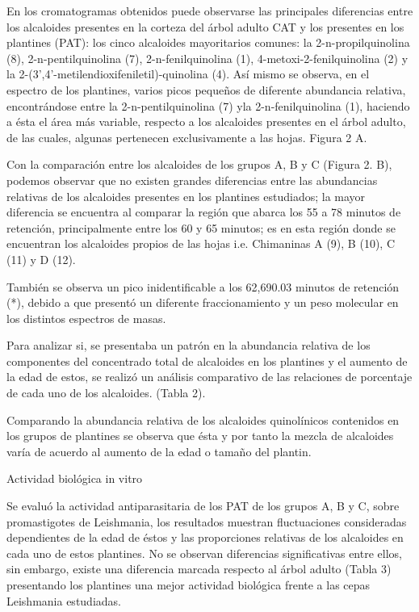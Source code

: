 \documentclass{article}
\begin{document}
En los cromatogramas obtenidos puede observarse las principales diferencias
entre los alcaloides presentes en la corteza del árbol adulto CAT y los
presentes en los plantines (PAT): los cinco alcaloides mayoritarios comunes: la
2-n-propilquinolina (8), 2-n-pentilquinolina (7), 2-n-fenilquinolina (1),
4-metoxi-2-fenilquinolina (2) y la 2-(3',4'-metilendioxifeniletil)-quinolina
(4). Así mismo se observa, en el espectro de los plantines, varios picos
pequeños de diferente abundancia relativa, encontrándose entre la
2-n-pentilquinolina (7) yla 2-n-fenilquinolina (1), haciendo a ésta el área más
variable, respecto a los alcaloides presentes en el árbol adulto, de las cuales,
algunas pertenecen exclusivamente a las hojas. Figura 2 A.

Con la comparación entre los alcaloides de los grupos A, B y C (Figura 2. B),
podemos observar que no existen grandes diferencias entre las abundancias
relativas de los alcaloides presentes en los plantines estudiados; la mayor
diferencia se encuentra al comparar la región que abarca los 55 a 78 minutos de
retención, principalmente entre los 60 y 65 minutos; es en esta región donde se
encuentran los alcaloides propios de las hojas i.e. Chimaninas A (9), B (10), C
(11) y D (12).

También se observa un pico inidentificable a los 62,690.03 minutos de retención
(*), debido a que presentó un diferente fraccionamiento y un peso molecular en
los distintos espectros de masas.

Para analizar si, se presentaba un patrón en la abundancia relativa de los
componentes del concentrado total de alcaloides en los plantines y el aumento de
la edad de estos, se realizó un análisis comparativo de las relaciones de
porcentaje de cada uno de los alcaloides. (Tabla 2).

Comparando la abundancia relativa de los alcaloides quinolínicos contenidos en
los grupos de plantines se observa que ésta y por tanto la mezcla de alcaloides
varía de acuerdo al aumento de la edad o tamaño del plantin.

Actividad biológica in vitro

Se evaluó la actividad antiparasitaria de los PAT de los grupos A, B y C, sobre
promastigotes de Leishmania, los resultados muestran fluctuaciones consideradas
dependientes de la edad de éstos y las proporciones relativas de los alcaloides
en cada uno de estos plantines. No se observan diferencias significativas entre
ellos, sin embargo, existe una diferencia marcada respecto al árbol adulto
(Tabla 3) presentando los plantines una mejor actividad biológica frente a las
cepas Leishmania estudiadas.
\end{document}
